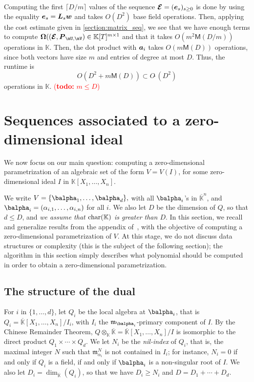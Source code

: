 \documentclass[12pt]{article}
\newcommand{\mat}[1]{\bm{\MakeUppercase{#1}}} %
\newcommand{\row}[1]{\bm{\MakeLowercase{#1}}} %
\newcommand{\col}[1]{\bm{\MakeLowercase{#1}}} %
\newcommand{\softO}[1]{O{\tilde{~}}(#1)} %
\newcommand{\todo}[1]{\textcolor{red}{({\bf todo:} #1)}}
\def\M {\ensuremath{\mathsf{M}}}
\def\K{\mathbb{K}}
\def\K {\ensuremath{\mathbb{K}}}
\def\Kbar {{\ensuremath{\overline{\mathbb{K}}}}}
\def\D {\ensuremath{D}}
\def\m {\ensuremath{\mathfrak{m}}}
\begin{document}
Computing the first $\lceil D/m \rceil$ values of the sequence
$\mat{\mathcal{E}}=(\col{e}_s)_{s \ge 0}$ is done by using the
equality $\col{E}_s = \mat{L}_s \col{w}$ and takes $O(D^2)$ base field
operations. Then, applying the cost estimate given in
\cref{section:matrix_seq}, we see that we have enough terms to compute
$\mat{\Omega}( (\mat{\mathcal{E}}, \mat{P}_{\mU,\mV}) \in \K[T]^{m
  \times 1}$ and that it takes $O(m^2 \M(D/m))$ operations in
$\K$. Then, the dot product with $\row{a}_i$ takes $O(m \M(D))$
operations, since both vectors have size $m$ and entries of degree at
most $D$. Thus, the runtime is 
$$O(D^2 + m \M(D)) \subset \softO{D^2}$$
operations in $\K$. \todo{$m \le D$}



\section{Sequences associated to a zero-dimensional ideal}

We now focus on our main question: computing a zero-dimensional
parametrization of an algebraic set of the form $V=V(I)$, for some
zero-dimensional ideal $I$ in $\K[X_1,\dots,X_n]$. 

We write $V=\{\balpha_1,\dots,\balpha_d\},$ with all $\balpha_i$'s in
$\Kbar^n$, and $\balpha_i=(\alpha_{i,1},\dots,\alpha_{i,n})$ for all
$i$.  We also let $\D$ be the dimension of $Q$, so that $d \le \D$,
and {\em we assume that ${\rm char}(\K)$ is greater than $D$}. In this
section, we recall and generalize results from the appendix
of~\cite{BoSaSc03}, with the objective of computing a zero-dimensional
parametrization of $V$. At this stage, we do not discuss data
structures or complexity (this is the subject of the following
section); the algorithm in this section simply describes what 
polynomial should be computed in order to obtain a zero-dimensional
parametrization.



\subsection{The structure of the dual}  

For $i$ in $\{1,\dots,d\}$, let $Q_i$ be the local algebra at
$\balpha_i$, that is $Q_i=\Kbar[X_1,\dots,X_n]/I_i$, with $I_i$ the
$\m_{\balpha_i}$-primary component of $I$. By the Chinese Remainder
Theorem, $Q\otimes_\K \Kbar=\Kbar[X_1,\dots,X_n]/I$ is isomorphic to
the direct product $Q_1\times \cdots \times Q_d$.  We let $N_i$ be the
{\em nil-index} of $Q_i$, that is, the maximal integer $N$ such that
$\m_{\alpha_i}^N$ is not contained in $I_i$; for instance, $N_i=0$ if
and only if $Q_i$ is a field, if and only if $\balpha_i$ is a
non-singular root of $I$. We also let
$\D_i=\dim_\Kbar(Q_i)$, so that we have $D_i \ge N_i$ and $\D=\D_1 + \cdots + \D_d$.
\end{document}
